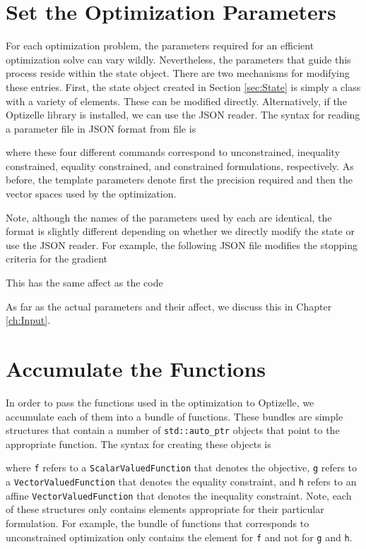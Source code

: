 \documentclass{report}
\begin{document}
\section{Set the Optimization Parameters}

        For each optimization problem, the parameters required for an efficient optimization solve can vary wildly.  Nevertheless, the parameters that guide this process reside within the state object.  There are two mechanisms for modifying these entries.  First, the state object created in Section \ref{sec:State} is simply a class with a variety of elements.  These can be modified directly.  Alternatively, if the Optizelle library is installed, we can use the JSON reader.  The syntax for reading a parameter file in JSON format from file is

where these four different commands correspond to unconstrained, inequality constrained, equality constrained, and constrained formulations, respectively.  As before, the template parameters denote first the precision required and then the vector spaces used by the optimization.

        Note, although the names of the parameters used by each are identical, the format is slightly different depending on whether we directly modify the state or use the JSON reader.  For example, the following JSON file modifies the stopping criteria for the gradient

This has the same affect as the code


        As far as the actual parameters and their affect, we discuss this in Chapter \ref{ch:Input}.

\section{Accumulate the Functions}

        In order to pass the functions used in the optimization to Optizelle, we accumulate each of them into a bundle of functions.  These bundles are simple structures that contain a number of \texttt{std::auto\_ptr} objects that point to the appropriate function.  The syntax for creating these objects is

where \texttt{f} refers to a \texttt{ScalarValuedFunction} that denotes the objective, \texttt{g} refers to a \texttt{VectorValuedFunction} that denotes the equality constraint, and \texttt{h} refers to an affine \texttt{VectorValuedFunction} that denotes the inequality constraint.  Note, each of these structures only contains elements appropriate for their particular formulation.  For example, the bundle of functions that corresponds to unconstrained optimization only contains the element for \texttt{f} and not for \texttt{g} and \texttt{h}.
\end{document}
